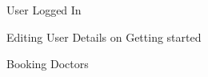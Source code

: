 \begin{figure}[H]
    \centering
    \qquad
    \caption{User Logged In}%
    \centering
\end{figure}

\begin{figure}[H]
    \centering
    \qquad
    \caption{Editing User Details on Getting started}%
    \centering
\end{figure}

\begin{figure}[H]
    \centering
    \qquad
    \caption{Booking Doctors}%
    \centering
\end{figure}

